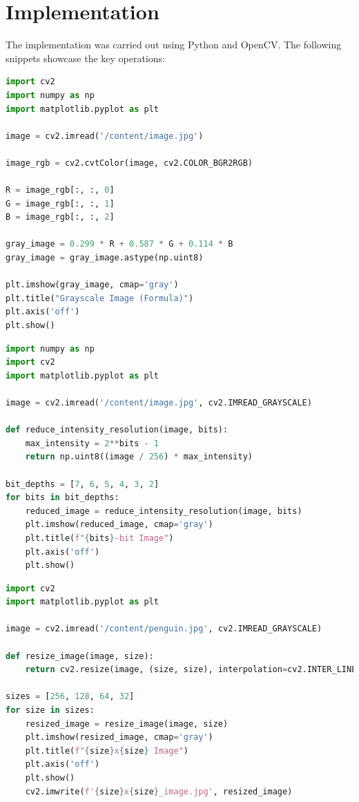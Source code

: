 \documentclass{report}
\begin{document}
\section{Implementation}
The implementation was carried out using Python and OpenCV. The following snippets showcase the key operations:

\begin{lstlisting}[language=Python, caption=Convert RGB to Grayscale, label=code:grayscale]
import cv2
import numpy as np
import matplotlib.pyplot as plt

image = cv2.imread('/content/image.jpg')

image_rgb = cv2.cvtColor(image, cv2.COLOR_BGR2RGB)

R = image_rgb[:, :, 0]
G = image_rgb[:, :, 1]
B = image_rgb[:, :, 2]

gray_image = 0.299 * R + 0.587 * G + 0.114 * B
gray_image = gray_image.astype(np.uint8)

plt.imshow(gray_image, cmap='gray')
plt.title("Grayscale Image (Formula)")
plt.axis('off')
plt.show()
\end{lstlisting}

\begin{lstlisting}[language=Python, caption=Bit Depth Reduction, label=code:intensity-resolution]
import numpy as np
import cv2
import matplotlib.pyplot as plt

image = cv2.imread('/content/image.jpg', cv2.IMREAD_GRAYSCALE)

def reduce_intensity_resolution(image, bits):
    max_intensity = 2**bits - 1
    return np.uint8((image / 256) * max_intensity)

bit_depths = [7, 6, 5, 4, 3, 2]
for bits in bit_depths:
    reduced_image = reduce_intensity_resolution(image, bits)
    plt.imshow(reduced_image, cmap='gray')
    plt.title(f"{bits}-bit Image")
    plt.axis('off')
    plt.show()
\end{lstlisting}

\begin{lstlisting}[language=Python, caption=Spatial Resolution Adjustment, label=code:spatial-resolution]
import cv2
import matplotlib.pyplot as plt

image = cv2.imread('/content/penguin.jpg', cv2.IMREAD_GRAYSCALE)

def resize_image(image, size):
    return cv2.resize(image, (size, size), interpolation=cv2.INTER_LINEAR)

sizes = [256, 128, 64, 32]
for size in sizes:
    resized_image = resize_image(image, size)
    plt.imshow(resized_image, cmap='gray')
    plt.title(f"{size}x{size} Image")
    plt.axis('off')
    plt.show()
    cv2.imwrite(f'{size}x{size}_image.jpg', resized_image)
\end{lstlisting}
\end{document}
